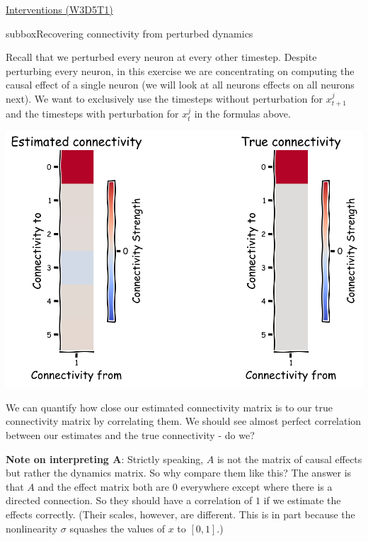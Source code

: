 \begin{textbox}{\href{https://compneuro.neuromatch.io/tutorials/W3D5_NetworkCausality/student/W3D5_Tutorial1.html}{Interventions (W3D5T1)}   }

\begin{subbox}{subbox}{Recovering connectivity from perturbed dynamics}
\scriptsize

Recall that we perturbed every neuron at every other timestep. Despite perturbing every neuron, in this exercise we are concentrating on computing the causal effect of a single neuron (we will look at all neurons effects on all neurons next). We want to exclusively use the timesteps without perturbation for $x^j_{t+1}$ and the timesteps with perturbation for $x^j_{t}$ in the formulas above.

\begin{center}
    
\includegraphics[scale=0.15]{Figures/NC/NC_Figure4.png}
\end{center}
We can quantify how close our estimated connectivity matrix is to our true connectivity matrix by correlating them. We should see almost perfect correlation between our estimates and the true connectivity - do we?

\textbf{Note on interpreting A}: Strictly speaking, $A$ is not the matrix of causal effects but rather the dynamics matrix. So why compare them like this? The answer is that $A$ and the effect matrix both are $0$ everywhere except where there is a directed connection. So they should have a correlation of $1$ if we estimate the effects correctly. (Their scales, however, are different. This is in part because the nonlinearity $\sigma$ squashes the values of $x$ to $[0,1]$.) 
\begin{center}
    

\end{center}
\end{subbox}
\end{textbox}
